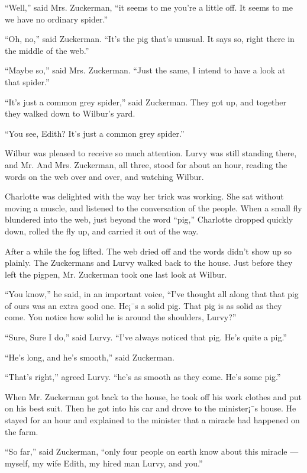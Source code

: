\documentclass[a4paper, oneside]{book}
\begin{document}
``Well,'' said Mrs. Zuckerman, ``it seems to me you're a little off.
It seems to me we have no ordinary spider.''

``Oh, no,'' said Zuckerman. ``It's the pig that's unusual. It says
so, right there in the middle of the web.''

``Maybe so,'' said Mrs. Zuckerman. ``Just the same, I intend to
have a look at that spider.''

``It's just a common grey spider,'' said Zuckerman.
They got up, and together they walked down to Wilbur's yard.

``You see, Edith? It's just a common grey spider.''

Wilbur was pleased to receive so much attention. Lurvy was
still standing there, and Mr. And Mrs. Zuckerman, all three, stood
for about an hour, reading the words on the web over and over, and
watching Wilbur.

Charlotte was delighted with the way her trick was working.
She sat without moving a muscle, and listened to the conversation
of the people. When a small fly blundered into the web, just beyond
the word ``pig,'' Charlotte dropped quickly down, rolled the fly up,
and carried it out of the way.

After a while the fog lifted. The web dried off and the words
didn't show up so plainly. The Zuckermans and Lurvy walked back
to the house. Just before they left the pigpen, Mr. Zuckerman took
one last look at Wilbur.

``You know,'' he said, in an important voice, ``I've thought all
along that that pig of ours was an extra good one. He¡¯s a solid pig.
That pig is as solid as they come. You notice how solid he is around
the shoulders, Lurvy?''

``Sure, Sure I do,'' said Lurvy. ``I've always noticed that pig.
He's quite a pig.''

``He's long, and he's smooth,'' said Zuckerman.

``That's right,'' agreed Lurvy. ``he's as smooth as they come.
He's some pig.''

When Mr. Zuckerman got back to the house, he took off his
work clothes and put on his best suit. Then he got into his car and
drove to the minister¡¯s house. He stayed for an hour and explained
to the minister that a miracle had happened on the farm.

``So far,'' said Zuckerman, ``only four people on earth know
about this miracle --- myself, my wife Edith, my hired man Lurvy,
and you.''
\end{document}
